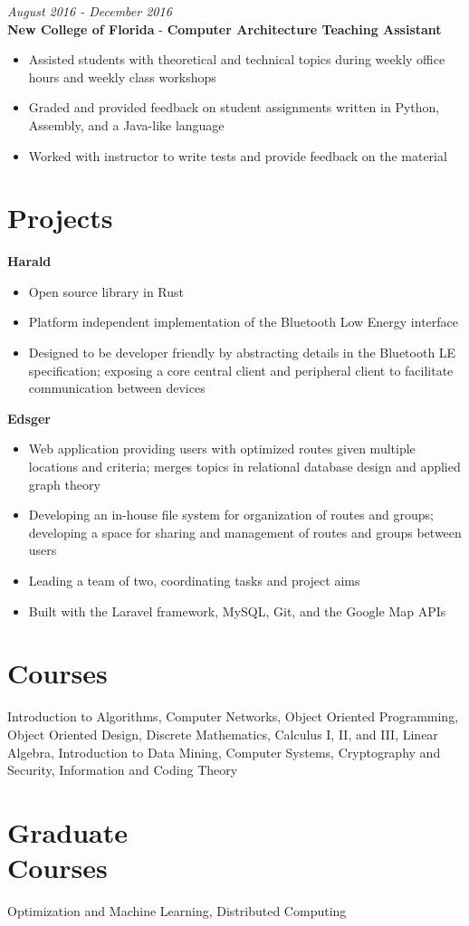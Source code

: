 \documentclass[margin,line,a4paper]{resume}
\begin{document}
\begin{resume}
        \textit{August 2016 - December 2016}\\
        \textbf{New College of Florida} - \textbf{Computer Architecture Teaching Assistant}
        \begin{itemize}
            \item Assisted students with theoretical and technical topics during weekly office hours and weekly class workshops
            \item Graded and provided feedback on student assignments written in Python, Assembly, and a Java-like language 
            \item Worked with instructor to write tests and provide feedback on the material
        \end{itemize}
        
    \section{\mysidestyle Projects}
        \textbf{Harald}
        \begin{itemize}
            \item Open source library in Rust
            \item Platform independent implementation of the Bluetooth Low Energy interface
            \item Designed to be developer friendly by abstracting details in the Bluetooth LE specification; exposing a core central client and peripheral client to facilitate communication between devices
        \end{itemize}
        
        \textbf{Edsger}
        \begin{itemize}
            \item Web application providing users with optimized routes given multiple locations and criteria; merges topics in relational database design and applied graph theory
            \item Developing an in-house file system for organization of routes and groups; developing a space for sharing and management of routes and groups between users
            \item Leading a team of two, coordinating tasks and project aims
            \item Built with the Laravel framework, MySQL, Git, and the Google Map APIs
        \end{itemize}
    
    \section{\mysidestyle Courses}
        Introduction to Algorithms, Computer Networks, Object Oriented Programming, Object Oriented Design, Discrete Mathematics, Calculus I, II, and III, Linear Algebra, Introduction to Data Mining, Computer Systems, Cryptography and Security, Information and Coding Theory
        
    \section{\mysidestyle Graduate\\Courses}
        Optimization and Machine Learning, Distributed Computing
        
\end{resume}
\end{document}
